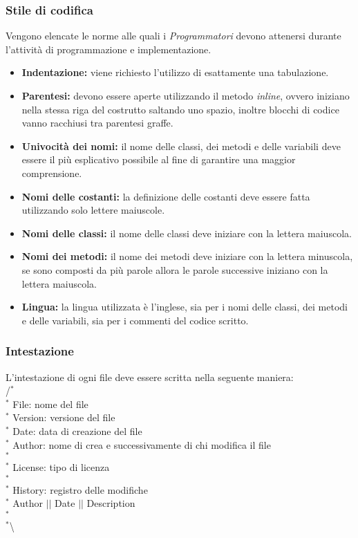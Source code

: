 \subsubsection{Stile di codifica}
Vengono elencate le norme alle quali i \textit{Programmatori} devono attenersi durante l'attività di programmazione e implementazione.
\begin{itemize}
	\item \textbf{Indentazione:} viene richiesto l'utilizzo di esattamente una tabulazione.
	\item \textbf{Parentesi:} devono essere aperte utilizzando il metodo \textit{inline}, ovvero iniziano nella stessa riga del costrutto saltando uno spazio, inoltre blocchi di codice vanno racchiusi tra parentesi graffe.
	\item \textbf{Univocità dei nomi:} il nome delle classi, dei metodi e delle variabili deve essere il più esplicativo possibile al fine di garantire una maggior comprensione.
	\item \textbf{Nomi delle costanti:} la definizione delle costanti deve essere fatta utilizzando solo lettere maiuscole.
	\item \textbf{Nomi delle classi:} il nome delle classi deve iniziare con la lettera maiuscola.
	\item \textbf{Nomi dei metodi:} il nome dei metodi deve iniziare con la lettera minuscola, se sono composti da più parole allora le parole successive iniziano con la lettera maiuscola.
	\item \textbf{Lingua:} la lingua utilizzata è l'inglese, sia per i nomi delle classi, dei metodi e delle variabili, sia per i commenti del codice scritto.
\end{itemize}

\subsubsection{Intestazione}
L'intestazione di ogni file deve essere scritta nella seguente maniera: \\
/$^{*}$\\
$^{*}$ File: nome del file \\
$^{*}$ Version: versione del file \\
$^{*}$ Date: data di creazione del file \\
$^{*}$ Author: nome di crea e successivamente di chi modifica il file \\
$^{*}$ \\
$^{*}$ License: tipo di licenza \\
$^{*}$ \\
$^{*}$ History: registro delle modifiche \\
$^{*}$ Author $\vert$$\vert$ Date $\vert$$\vert$ Description \\
$^{*}$ \\
$^{*}$\textbackslash

